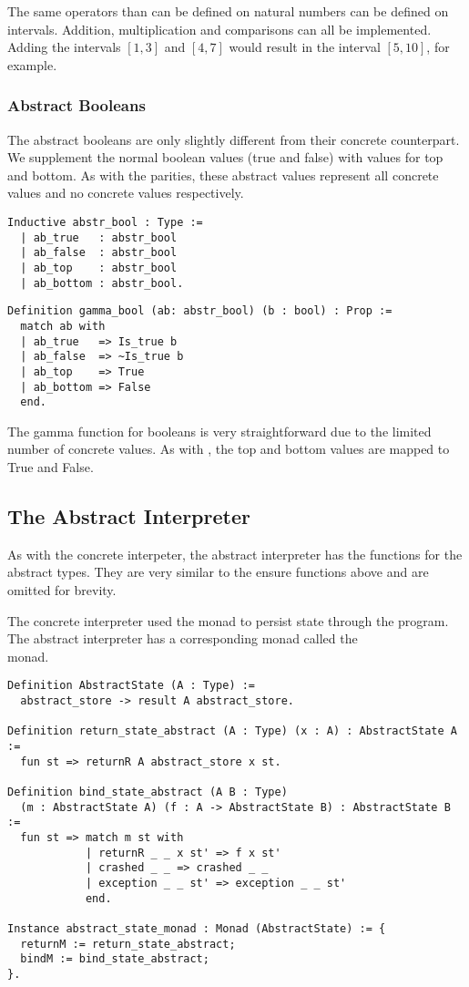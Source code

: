 The same operators than can be defined on natural numbers can be defined on
intervals. Addition, multiplication and comparisons can all be implemented.
Adding the intervals $[1,3]$ and $[4, 7]$ would result in the interval $[5,
10]$, for example. 

\subsubsection{Abstract Booleans}
The abstract booleans are only slightly different from their concrete
counterpart. We supplement the normal boolean values (true and false) with
values for top and bottom. As with the parities, these abstract values
represent all concrete values and no concrete values respectively.

\begin{verbatim}
Inductive abstr_bool : Type :=
  | ab_true   : abstr_bool
  | ab_false  : abstr_bool
  | ab_top    : abstr_bool
  | ab_bottom : abstr_bool.
\end{verbatim}

\begin{verbatim}
Definition gamma_bool (ab: abstr_bool) (b : bool) : Prop :=
  match ab with
  | ab_true   => Is_true b
  | ab_false  => ~Is_true b
  | ab_top    => True
  | ab_bottom => False
  end.
\end{verbatim}

The gamma function for booleans is very straightforward due to the limited
number of concrete values. As with , the top and bottom
values are mapped to True and False.

\subsection{The Abstract Interpreter}
As with the concrete interpeter, the abstract interpreter has the
 functions for the abstract types. 
They are very similar to the ensure functions above and are omitted for brevity. 

The concrete interpreter used the  monad to persist state through
the program. The abstract interpreter has a corresponding monad called the \\
 monad.

\begin{verbatim}
Definition AbstractState (A : Type) :=
  abstract_store -> result A abstract_store.

Definition return_state_abstract (A : Type) (x : A) : AbstractState A :=
  fun st => returnR A abstract_store x st.

Definition bind_state_abstract (A B : Type) 
  (m : AbstractState A) (f : A -> AbstractState B) : AbstractState B :=
  fun st => match m st with
            | returnR _ _ x st' => f x st'
            | crashed _ _ => crashed _ _
            | exception _ _ st' => exception _ _ st' 
            end.

Instance abstract_state_monad : Monad (AbstractState) := {
  returnM := return_state_abstract;
  bindM := bind_state_abstract;
}.
\end{verbatim}

